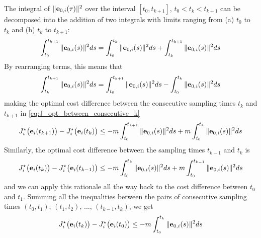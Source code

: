 \begin{gg_box}
  The integral of $\|\bm{\mathbf{e}}_{0,i}(\tau)\|^2$ over the interval $[t_0, t_{k+1}]$,
  $t_0 < t_k < t_{k+1}$ can be decomposed into the addition of two integrals
  with limits ranging from (a) $t_0$ to $t_k$ and (b) $t_k$ to $t_{k+1}$:
  \begin{align}
    \int_{t_0}^{t_{k+1}} \|\bm{\mathbf{e}}_{0,i}(s)\|^2 ds = \int_{t_0}^{t_{k}} \|\bm{\mathbf{e}}_{0,i}(s)\|^2 ds + \int_{t_k}^{t_{k+1}} \|\bm{\mathbf{e}}_{0,i}(s)\|^2 ds
  \end{align}
  By rearranging terms, this means that
  \begin{align}
    \int_{t_k}^{t_{k+1}} \|\bm{\mathbf{e}}_{0,i}(s)\|^2 ds = \int_{t_0}^{t_{k+1}} \|\bm{\mathbf{e}}_{0,i}(s)\|^2 ds - \int_{t_0}^{t_{k}} \|\bm{\mathbf{e}}_{0,i}(s)\|^2 ds
  \end{align}
  making the optimal cost difference between the consecutive sampling times
  $t_k$ and $t_{k+1}$ in \eqref{eq:J_opt_between_consecutive_k}
  \begin{align}
    J_i^{\star}\big(\bm{\mathbf{e}}_i(t_{k+1})\big) - J_i^{\star}\big(\bm{\mathbf{e}}_i(t_k)\big) \leq
      -m \int_{t_0}^{t_{k+1}} \|\bm{\mathbf{e}}_{0,i}(s)\|^2 ds +m \int_{t_0}^{t_{k}} \|\bm{\mathbf{e}}_{0,i}(s)\|^2 ds
  \end{align}
  Similarly, the optimal cost difference between the sampling times $t_{k-1}$
  and $t_{k}$ is
  \begin{align}
    J_i^{\star}\big(\bm{\mathbf{e}}_i(t_{k})\big) - J_i^{\star}\big(\bm{\mathbf{e}}_i(t_{k-1})\big) \leq
      -m \int_{t_0}^{t_{k}} \|\bm{\mathbf{e}}_{0,i}(s)\|^2 ds +m \int_{t_0}^{t_{k-1}} \|\bm{\mathbf{e}}_{0,i}(s)\|^2 ds
  \end{align}
  and we can apply this rationale all the way back to the cost difference
  between $t_0$ and $t_1$. Summing all the inequalities between the pairs of
  consecutive sampling times $(t_0, t_1)$, $(t_1, t_2)$, $\dots$,
  $(t_{k-1}, t_k)$, we get
  \begin{align}
    J_i^{\star}\big(\bm{\mathbf{e}}_i(t_{k})\big) - J_i^{\star}\big(\bm{\mathbf{e}}_i(t_0)\big) \leq
      -m \int_{t_0}^{t_{k}} \|\bm{\mathbf{e}}_{0,i}(s)\|^2 ds
  \end{align}
\end{gg_box}

